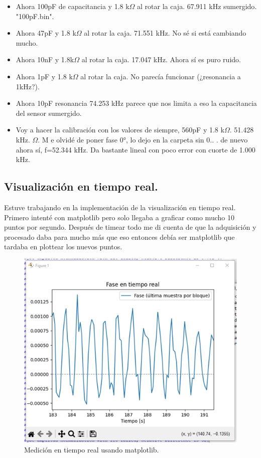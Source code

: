 \begin{itemize}
	\item Ahora 100pF de capacitancia y 1.8 k$\Omega$ al rotar la caja. 67.911 kHz sumergido. "100pF.bin". 
	
	\item Ahora 47pF y 1.8 k$\Omega$ al rotar la caja. 71.551 kHz. No sé si está cambiando mucho. 
	
	\item Ahora 10nF y 1.8k$\Omega$ al rotar la caja. 17.047 kHz. Ahora sí es puro ruido. 
	
	\item Ahora 1pF y 1.8 k$\Omega$ al rotar la caja. No parecía funcionar (¿resonancia a 1kHz?). 
	
	\item Ahora 10pF resonancia 74.253 kHz parece que nos limita a eso la capacitancia del sensor sumergido.  
	
	\item Voy a hacer la calibración con los valores de siempre, 560pF y 1.8 k$\Omega$. 51.428 kHz. $\Omega$. M e olvidé de poner fase 0°, lo dejo en la carpeta sin 0.. 
	. de nuevo ahora sí, f=52.344 kHz. Da bastante lineal con poco error con cuorte de 1.000 kHz. 
\end{itemize}

\vspace{2em}
\subsection*{Visualización en tiempo real.}
Estuve trabajando en la implementación de la visualización en tiempo real. Primero intenté con matplotlib pero solo llegaba a graficar como mucho 10 puntos por segundo. Después de timear todo me di cuenta de que la adquisición y procesado daba para mucho más que eso entonces debía ser matplotlib que tardaba en plottear los nuevos puntos. 


\begin{figure}[!ht] %
	\centering
	\includegraphics[width=0.567\linewidth]{Figures/16_06_2025/Tiempo_real_matplotlib}
	\caption{Medición en tiempo real usando matplotlib.}
	\label{fig:tiemporealmatplotlib}
\end{figure}

